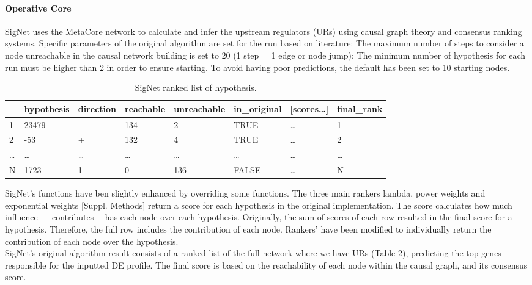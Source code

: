 \paragraph{Operative Core}
SigNet uses the MetaCore network to calculate and infer the upstream regulators (URs) using causal graph theory and consensus ranking systems. Specific parameters of the original algorithm are set for the run based on literature: The maximum number of steps to consider a node unreachable in the causal network building is set to 20 (1 step = 1 edge or node jump); The minimum number of hypothesis for each run must be higher than 2 in order to ensure starting. To avoid having poor predictions, the default has been set to 10 starting nodes.
\\
\begin{table}[!h]
\begin{tabular}{|l|l|l|l|l|l|l|l|}
\hline
  & hypothesis & direction & reachable & unreachable & in\_original & {[}scores…{]} & final\_rank \\ \hline
1 & 23479      & -         & 134       & 2           & TRUE         & …             & 1           \\ \hline
2 & -53        & +         & 132       & 4           & TRUE         & …             & 2           \\ \hline
… & …          & …         & …         & …           & …            & …             & …           \\ \hline
N & 1723       & 1         & 0         & 136         & FALSE        & …             & N           \\ \hline
\end{tabular}
\caption{SigNet ranked list of hypothesis.}
\label{tbl:signet_output}
\end{table}

SigNet’s functions have ben slightly enhanced by overriding some functions. The three main rankers lambda, power weights and exponential weights [Suppl. Methods] return a score for each hypothesis in the original implementation. The score calculates how much influence — contributes— has each node over each hypothesis. Originally, the sum of scores of each row resulted in the final score for a hypothesis. Therefore, the full row includes the contribution of each node. Rankers’ have been modified to individually return the contribution of each node over the hypothesis.
\\

SigNet’s original algorithm result consists of a ranked list of the full network where we have URs (Table 2), predicting the top genes responsible for the inputted DE profile. The final score is based on the reachability of each node within the causal graph, and its consensus score.
\\

